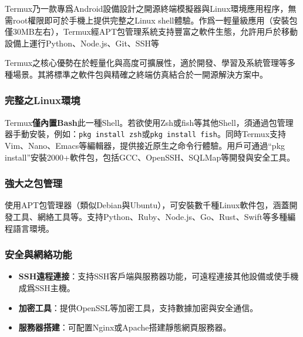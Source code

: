 


Termux乃一款專爲Android設備設計之開源終端模擬器與Linux環境應用程序，無需root權限即可於手機上提供完整之Linux shell體驗。作爲一輕量級應用（安裝包僅30MB左右），Termux經APT包管理系統支持豐富之軟件生態，允許用戶於移動設備上運行Python、Node.js、Git、SSH等

Termux之核心優勢在於輕量化與高度可擴展性，適於開發、學習及系統管理等多種場景。其將標準之軟件包與精確之終端仿真結合於一開源解決方案中。


\subsubsection*{完整之Linux環境}

Termux\textbf{僅內置Bash}此一種Shell。若欲使用Zsh或fish等其他Shell，須通過包管理器手動安裝，例如：\texttt{pkg install zsh}或\texttt{pkg install fish}。同時Termux支持Vim、Nano、Emacs等編輯器，提供接近原生之命令行體驗。用戶可通過“pkg install”安裝2000+軟件包，包括GCC、OpenSSH、SQLMap等開發與安全工具。

\subsubsection*{強大之包管理}

使用APT包管理器（類似Debian與Ubuntu），可安裝數千種Linux軟件包，涵蓋開發工具、網絡工具等。支持Python、Ruby、Node.js、Go、Rust、Swift等多種編程語言環境。

\subsubsection*{安全與網絡功能}

\begin{itemize}
  \item \textbf{SSH遠程連接}：支持SSH客戶端與服務器功能，可遠程連接其他設備或使手機成爲SSH主機。
  \item \textbf{加密工具}：提供OpenSSL等加密工具，支持數據加密與安全通信。
  \item \textbf{服務器搭建}：可配置Nginx或Apache搭建靜態網頁服務器。
\end{itemize}

